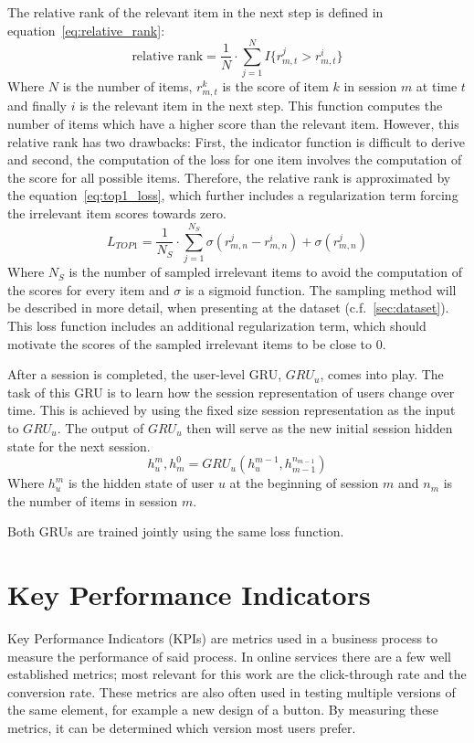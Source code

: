 The relative rank of the relevant item in the next step is defined in equation~\ref{eq:relative_rank}:
\begin{equation}\label{eq:relative_rank}
    \text{relative rank} = \frac{1}{N}\cdot \sum_{j=1}^{N} I\lbrace r_{m,t}^j > r_{m,t}^i \rbrace
\end{equation}
Where $N$ is the number of items, $r_{m,t}^k$ is the score of item $k$ in session $m$ at time $t$ and finally $i$ is the relevant item in the next step.
This function computes the number of items which have a higher score than the relevant item.
However, this relative rank has two drawbacks: First, the indicator function is difficult to derive and second, the computation of the loss for one item involves the computation of the score for all possible items.
Therefore, the relative rank is approximated by the equation~\ref{eq:top1_loss}, which further includes a regularization term forcing the irrelevant item scores towards zero.
\begin{equation}\label{eq:top1_loss}
    L_{TOP1} = \frac{1}{N_S} \cdot \sum_{j=1}^{N_S} \sigma(r_{m,n}^j - r_{m,n}^i) + \sigma(r_{m,n}^j)
\end{equation}
Where $N_S$ is the number of sampled irrelevant items to avoid the computation of the scores for every item and $\sigma$ is a sigmoid function.
The sampling method will be described in more detail, when presenting at the dataset (c.f.~\ref{sec:dataset}).
This loss function includes an additional regularization term, which should motivate the scores of the sampled irrelevant items to be close to 0.
\par
After a session is completed, the user-level GRU, $GRU_u$, comes into play.
The task of this GRU is to learn how the session representation of users change over time.
This is achieved by using the fixed size session representation as the input to $GRU_u$.
The output of $GRU_u$ then will serve as the new initial session hidden state for the next session.
\begin{equation}\label{eq:hgru4rec_user}
    h_u^m, h_m^0 = GRU_u(h_u^{m-1}, h_{m-1}^{n_{m-1}})
\end{equation}
Where $h_u^m$ is the hidden state of user $u$ at the beginning of session $m$ and $n_m$ is the number of items in session $m$.
\par
Both GRUs are trained jointly using the same loss function.

\section{Key Performance Indicators}
Key Performance Indicators (KPIs) are metrics used in a business process to measure the performance of said process.
In online services there are a few well established metrics; most relevant for this work are the click-through rate and the conversion rate.
These metrics are also often used in testing multiple versions of the same element, for example a new design of a button.
By measuring these metrics, it can be determined which version most users prefer.
